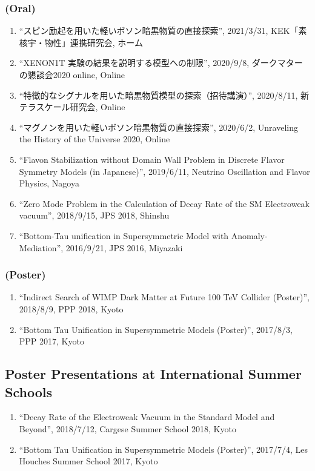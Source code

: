 \documentclass[12pt]{article}
\begin{document}
\subsubsection*{(Oral)}
\begin{enumerate}
 \item ``スピン励起を用いた軽いボソン暗黒物質の直接探索'', 2021/3/31, KEK「素核宇・物性」連携研究会, ホーム
 \item ``XENON1T 実験の結果を説明する模型への制限'', 2020/9/8, ダークマターの懇談会2020 online, Online
 \item ``特徴的なシグナルを用いた暗黒物質模型の探索（招待講演）'', 2020/8/11, 新テラスケール研究会, Online
 \item ``マグノンを用いた軽いボソン暗黒物質の直接探索'', 2020/6/2, Unraveling the History of the Universe 2020, Online
 \item ``Flavon Stabilization without Domain Wall Problem in Discrete Flavor Symmetry Models (in Japanese)'', 2019/6/11, Neutrino Oscillation and Flavor Physics, Nagoya
 \item ``Zero Mode Problem in the Calculation of Decay Rate of the SM Electroweak vacuum'', 2018/9/15, JPS 2018, Shinshu
 \item ``Bottom-Tau unification in Supersymmetric Model with Anomaly-Mediation'', 2016/9/21, JPS 2016, Miyazaki
\end{enumerate}
\subsubsection*{(Poster)}
\begin{enumerate}
 \item ``Indirect Search of WIMP Dark Matter at Future 100 TeV Collider (Poster)'', 2018/8/9, PPP 2018, Kyoto
 \item ``Bottom Tau Unification in Supersymmetric Models (Poster)'', 2017/8/3, PPP 2017, Kyoto
\end{enumerate}

\subsection*{Poster Presentations at International Summer Schools}
\begin{enumerate}
 \item ``Decay Rate of the Electroweak Vacuum in the Standard Model and Beyond'', 2018/7/12, Cargese Summer School 2018, Kyoto
 \item ``Bottom Tau Unification in Supersymmetric Models (Poster)'', 2017/7/4, Les Houches Summer School 2017, Kyoto
\end{enumerate}
\end{document}
